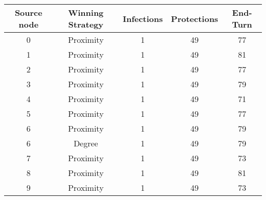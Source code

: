 \documentclass[results.tex]{subfiles}
\begin{document}
    \begin{center}
        \begin{tabular}{| c || c | c | c | c |}
            \hline
            {\bfseries Source node} & {\bfseries Winning Strategy} & {\bfseries Infections} & {\bfseries Protections}
            & {\bfseries End-Turn}
            \\  %
            \hline\hline
            0                       & Proximity                    & 1                      & 49                      & 77                   \\
            \hline
            1                       & Proximity                    & 1                      & 49                      & 81                   \\
            \hline
            2                       & Proximity                    & 1                      & 49                      & 77                   \\
            \hline
            3                       & Proximity                    & 1                      & 49                      & 79                   \\
            \hline
            4                       & Proximity                    & 1                      & 49                      & 71                   \\
            \hline
            5                       & Proximity                    & 1                      & 49                      & 77                   \\
            \hline
            6                       & Proximity                    & 1                      & 49                      & 79                   \\
            \hline
            6                       & Degree                       & 1                      & 49                      & 79                   \\
            \hline
            7                       & Proximity                    & 1                      & 49                      & 73                   \\
            \hline
            8                       & Proximity                    & 1                      & 49                      & 81                   \\
            \hline
            9                       & Proximity                    & 1                      & 49                      & 73                   \\

\end{tabular}
\end{center}
\end{document}
